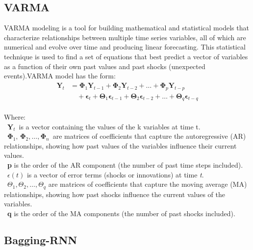 \documentclass{ieeeojies}
\begin{document}
\subsection{VARMA}
VARMA modeling is a tool for building mathematical and statistical models that characterize relationships between multiple time series variables, all of which are numerical and evolve over time and producing linear forecasting. This statistical technique is used to find a set of equations that best predict a vector of variables as a function of their own past values and past shocks (unexpected events).VARMA model has the form:
\begin{equation}
\begin{split}
\mathbf{Y}_t &= \mathbf{\Phi}_1 \mathbf{Y}_{t-1} + \mathbf{\Phi}_2 \mathbf{Y}_{t-2} + \dots + \mathbf{\Phi}_p \mathbf{Y}_{t-p} \\
&\quad + \mathbf{\epsilon}_t + \mathbf{\Theta}_1 \mathbf{\epsilon}_{t-1} + \mathbf{\Theta}_2 \mathbf{\epsilon}_{t-2} + \dots + \mathbf{\Theta}_q \mathbf{\epsilon}_{t-q}
\end{split}
\end{equation}
\\
Where: \\ 
         \indent\textbullet\ \(\mathbf{Y}_t\)\ is a vector containing the values of the k variables at time t. \\
         \indent\textbullet\ \(\mathbf{\Phi}_1,\,\mathbf{\Phi}_2, \ldots, \mathbf{\Phi}_n\)\ are matrices of coefficients that capture the autoregressive (AR) relationships, showing how past values of the variables influence their current values. \\
         \indent\textbullet\ \textbf{p} is the order of the AR component (the number of past time steps included). \\
         \indent\textbullet\ \({\epsilon}(t)\) is  a vector of error terms (shocks or innovations) at time \textit{t}. \\
         \indent\textbullet\ \({\Theta}_1, {\Theta}_2, \ldots ,{\Theta}_q\) are matrices of coefficients that capture the moving average (MA) relationships, showing how past shocks influence the current values of the variables. \\
         \indent\textbullet\ \textbf{q} is the order of the MA components (the number of past shocks included). 
\subsection{Bagging-RNN}
\end{document}
